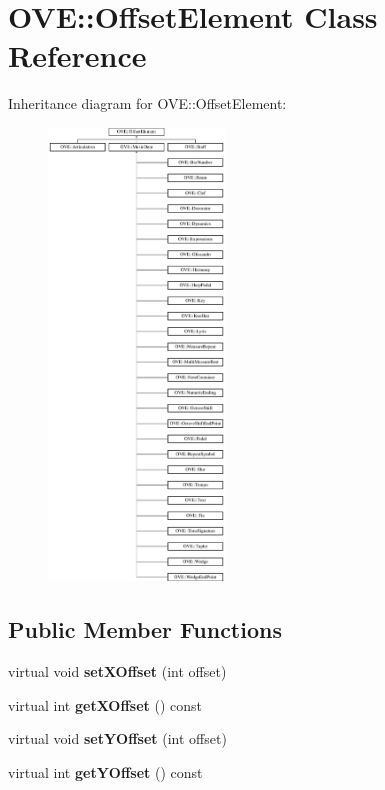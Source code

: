 \hypertarget{class_o_v_e_1_1_offset_element}{}\section{O\+VE\+:\+:Offset\+Element Class Reference}
\label{class_o_v_e_1_1_offset_element}
Inheritance diagram for O\+VE\+:\+:Offset\+Element\+:\begin{figure}[H]
\begin{center}
\leavevmode
\includegraphics[height=12.000000cm]{class_o_v_e_1_1_offset_element}
\end{center}
\end{figure}
\subsection*{Public Member Functions}
\begin{DoxyCompactItemize}
\item 
\mbox{\label{class_o_v_e_1_1_offset_element_a44a1db47d85e707b1ce872ddc628ef6b}} 
virtual void {\bfseries set\+X\+Offset} (int offset)
\item 
\mbox{\label{class_o_v_e_1_1_offset_element_a9b9985817917f810e0db3d853ddf3fb5}} 
virtual int {\bfseries get\+X\+Offset} () const
\item 
\mbox{\label{class_o_v_e_1_1_offset_element_a50e595469b8496e639988112f558a364}} 
virtual void {\bfseries set\+Y\+Offset} (int offset)
\item 
\mbox{\label{class_o_v_e_1_1_offset_element_a2f36812acf81ed5e5fecac65ed76daf5}} 
virtual int {\bfseries get\+Y\+Offset} () const
\end{DoxyCompactItemize}


